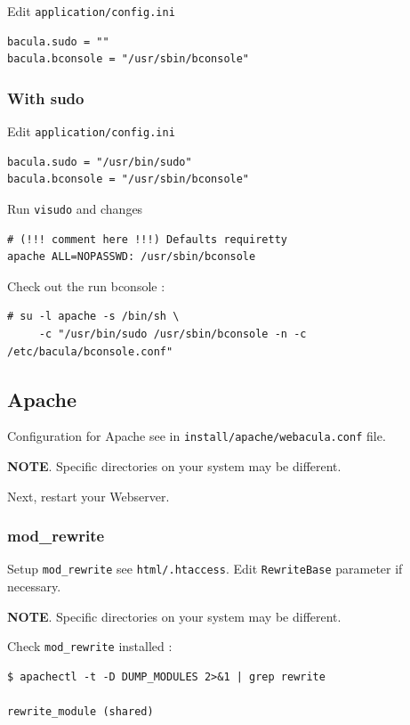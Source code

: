 \documentclass[10pt]{article}
\begin{document}
Edit \texttt{application/config.ini}
\begin{verbatim}
bacula.sudo = ""
bacula.bconsole = "/usr/sbin/bconsole"
\end{verbatim}



\subsubsection{With sudo}
\label{Install:Setting up to run bconsole from under Webacula:with sudo}

Edit \texttt{application/config.ini}
\begin{verbatim}
bacula.sudo = "/usr/bin/sudo"
bacula.bconsole = "/usr/sbin/bconsole"
\end{verbatim}

Run \texttt{visudo} and changes
\begin{verbatim}
# (!!! comment here !!!) Defaults requiretty
apache ALL=NOPASSWD: /usr/sbin/bconsole
\end{verbatim}

Check out the run bconsole :
\begin{verbatim}
# su -l apache -s /bin/sh \
     -c "/usr/bin/sudo /usr/sbin/bconsole -n -c /etc/bacula/bconsole.conf"
\end{verbatim}



\subsection{Apache}
\label{Install:Apache}

Configuration for Apache see in \texttt{install/apache/webacula.conf} file.

\textbf{NOTE}. Specific directories on your system may be different.

Next, restart your Webserver.



\subsubsection{mod\_rewrite}
\label{Install:Apache:mod rewrite}

Setup \texttt{mod\_rewrite} see \texttt{html/.htaccess}. Edit \texttt{RewriteBase} parameter if necessary.

\textbf{NOTE}. Specific directories on your system may be different.

Check \texttt{mod\_rewrite} installed :
\begin{verbatim}
$ apachectl -t -D DUMP_MODULES 2>&1 | grep rewrite

rewrite_module (shared)
\end{verbatim}
\end{document}
